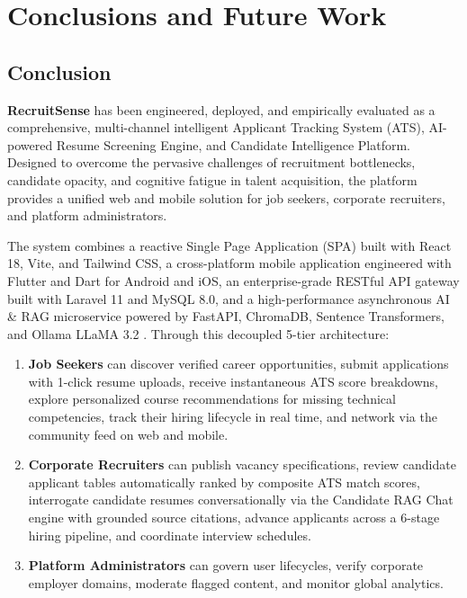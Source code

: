 \chapter{Conclusions and Future Work}\label{chap:conclusions}

\section{Conclusion}
\textbf{RecruitSense} has been engineered, deployed, and empirically evaluated as a comprehensive, multi-channel intelligent Applicant Tracking System (ATS), AI-powered Resume Screening Engine, and Candidate Intelligence Platform. Designed to overcome the pervasive challenges of recruitment bottlenecks, candidate opacity, and cognitive fatigue in talent acquisition, the platform provides a unified web and mobile solution for job seekers, corporate recruiters, and platform administrators.

The system combines a reactive Single Page Application (SPA) built with React 18, Vite, and Tailwind CSS, a cross-platform mobile application engineered with Flutter and Dart for Android and iOS, an enterprise-grade RESTful API gateway built with Laravel 11 and MySQL 8.0, and a high-performance asynchronous AI \& RAG microservice powered by FastAPI, ChromaDB, Sentence Transformers, and Ollama LLaMA 3.2 \cite{fielding2000rest, lewis2020rag, flutter2022google, ramirez2019fastapi}. Through this decoupled 5-tier architecture:
\begin{enumerate}
    \item \textbf{Job Seekers} can discover verified career opportunities, submit applications with 1-click resume uploads, receive instantaneous ATS score breakdowns, explore personalized course recommendations for missing technical competencies, track their hiring lifecycle in real time, and network via the community feed on web and mobile.
    \item \textbf{Corporate Recruiters} can publish vacancy specifications, review candidate applicant tables automatically ranked by composite ATS match scores, interrogate candidate resumes conversationally via the Candidate RAG Chat engine with grounded source citations, advance applicants across a 6-stage hiring pipeline, and coordinate interview schedules.
    \item \textbf{Platform Administrators} can govern user lifecycles, verify corporate employer domains, moderate flagged content, and monitor global analytics.
\end{enumerate}

